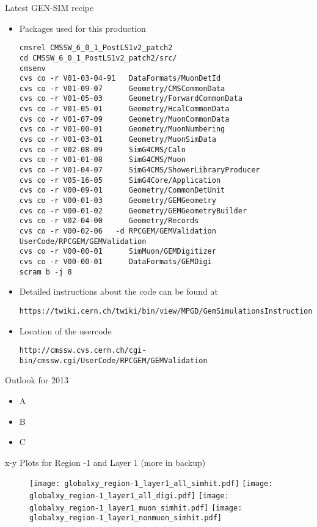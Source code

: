 \documentclass[11pt,a4paper]{beamer}
\begin{document}
\begin{frame}[fragile]{Latest GEN-SIM recipe}
\begin{itemize}
\item Packages used for this production
{\tiny
\begin{verbatim}
cmsrel CMSSW_6_0_1_PostLS1v2_patch2
cd CMSSW_6_0_1_PostLS1v2_patch2/src/
cmsenv
cvs co -r V01-03-04-91   DataFormats/MuonDetId
cvs co -r V01-09-07      Geometry/CMSCommonData
cvs co -r V01-05-03      Geometry/ForwardCommonData
cvs co -r V01-05-01      Geometry/HcalCommonData
cvs co -r V01-07-09      Geometry/MuonCommonData
cvs co -r V01-00-01      Geometry/MuonNumbering
cvs co -r V01-03-01      Geometry/MuonSimData
cvs co -r V02-08-09      SimG4CMS/Calo
cvs co -r V01-01-08      SimG4CMS/Muon
cvs co -r V01-04-07      SimG4CMS/ShowerLibraryProducer
cvs co -r V05-16-05      SimG4Core/Application
cvs co -r V00-09-01      Geometry/CommonDetUnit
cvs co -r V00-01-03      Geometry/GEMGeometry
cvs co -r V00-01-02      Geometry/GEMGeometryBuilder
cvs co -r V02-04-00      Geometry/Records
cvs co -r V00-02-06   -d RPCGEM/GEMValidation UserCode/RPCGEM/GEMValidation
cvs co -r V00-00-01      SimMuon/GEMDigitizer
cvs co -r V00-00-01      DataFormats/GEMDigi
scram b -j 8
\end{verbatim}
}
\item Detailed instructions about the code can be found at
{\tiny
\begin{verbatim}
https://twiki.cern.ch/twiki/bin/view/MPGD/GemSimulationsInstructionsCMSSW
\end{verbatim}
}
\item Location of the usercode
{\tiny
\begin{verbatim}
http://cmssw.cvs.cern.ch/cgi-bin/cmssw.cgi/UserCode/RPCGEM/GEMValidation
\end{verbatim}
}
\end{itemize}
\end{frame}

\begin{frame}{Outlook for 2013}
\begin{itemize}
\item A
\item B
\item C
\end{itemize}
\end{frame}

\begin{frame}{x-y Plots for Region -1 and Layer 1 (more in backup)}
\begin{figure}[htbp]
\hill
\texttt{[image: globalxy\_region-1\_layer1\_all\_simhit.pdf]} 
\hfill
\texttt{[image: globalxy\_region-1\_layer1\_all\_digi.pdf]}
\hfill
\texttt{[image: globalxy\_region-1\_layer1\_muon\_simhit.pdf]} 
\hfill
\texttt{[image: globalxy\_region-1\_layer1\_nonmuon\_simhit.pdf]}
\hfill
\end{figure}
\end{frame}
\end{document}
